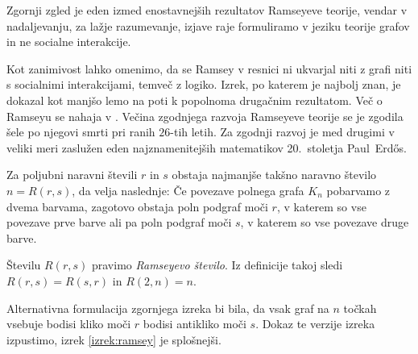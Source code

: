 \documentclass[twoside,11pt]{article}
\begin{document}
Zgornji zgled je eden izmed enostavnejših rezultatov Ramseyeve teorije, vendar v nadaljevanju,
za lažje razumevanje, izjave raje formuliramo v jeziku teorije grafov in ne socialne interakcije.

Kot zanimivost lahko omenimo, da se Ramsey v 
resnici ni ukvarjal niti z grafi niti s socialnimi interakcijami, temveč z logiko. Izrek, po katerem 
je najbolj znan, je dokazal kot manjšo lemo na poti k popolnoma drugačnim rezultatom. Več 
o Ramseyu se nahaja v \cite[poglavje 30]{color}. Večina zgodnjega razvoja 
Ramseyeve teorije se je zgodila šele po njegovi smrti pri ranih $26$-tih letih. Za zgodnji razvoj je 
med drugimi v veliki meri zaslužen eden najznamenitejših matematikov 20.~stoletja 
Paul~Erdős.

\begin{izrek}[Ramsey] \label{izrek:ramseyosnovni}
    Za poljubni naravni števili $r$ in $s$ obstaja najmanjše takšno naravno število 
    $n = R(r,s)$, da velja naslednje: Če povezave polnega grafa $K_n$ pobarvamo z dvema barvama, 
    zagotovo obstaja poln podgraf moči $r$, v katerem so vse povezave prve barve ali pa poln 
    podgraf moči $s$, v katerem so vse povezave druge barve.
\end{izrek}

Številu $R(r, s)$ pravimo \emph{Ramseyevo število}.
Iz definicije takoj sledi $R(r, s) = R(s, r)$ in $R(2, n) = n$.


Alternativna formulacija zgornjega izreka bi bila, da vsak graf na $n$ točkah vsebuje 
bodisi kliko moči $r$ bodisi antikliko moči $s$.
Dokaz te verzije izreka izpustimo, izrek \ref{izrek:ramsey} je splošnejši.
\end{document}
